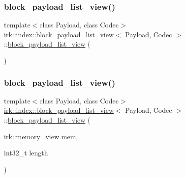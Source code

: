 \subsubsection{\texorpdfstring{block\+\_\+payload\+\_\+list\+\_\+view()}{block\_payload\_list\_view()}\hspace{0.1cm}{\footnotesize\ttfamily [1/2]}}
{\footnotesize\ttfamily template$<$class Payload, class Codec$>$ \\
\mbox{\hyperlink{classirk_1_1index_1_1block__payload__list__view}{irk\+::index\+::block\+\_\+payload\+\_\+list\+\_\+view}}$<$ Payload, Codec $>$\+::\mbox{\hyperlink{classirk_1_1index_1_1block__payload__list__view}{block\+\_\+payload\+\_\+list\+\_\+view}} (\begin{DoxyParamCaption}{ }\end{DoxyParamCaption})\hspace{0.3cm}{\ttfamily [default]}}

\mbox{\label{classirk_1_1index_1_1block__payload__list__view_aee904f5af8fd319298b5a6f4067dc1ef}} 
\subsubsection{\texorpdfstring{block\+\_\+payload\+\_\+list\+\_\+view()}{block\_payload\_list\_view()}\hspace{0.1cm}{\footnotesize\ttfamily [2/2]}}
{\footnotesize\ttfamily template$<$class Payload, class Codec$>$ \\
\mbox{\hyperlink{classirk_1_1index_1_1block__payload__list__view}{irk\+::index\+::block\+\_\+payload\+\_\+list\+\_\+view}}$<$ Payload, Codec $>$\+::\mbox{\hyperlink{classirk_1_1index_1_1block__payload__list__view}{block\+\_\+payload\+\_\+list\+\_\+view}} (\begin{DoxyParamCaption}\item[{\mbox{\hyperlink{classirk_1_1memory__view}{irk\+::memory\+\_\+view}}}]{mem,  }\item[{int32\+\_\+t}]{length }\end{DoxyParamCaption})\hspace{0.3cm}{\ttfamily [inline]}}



